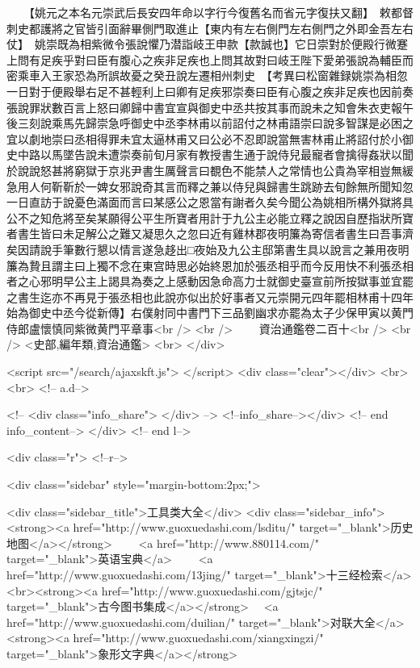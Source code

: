 　　【姚元之本名元崇武后長安四年命以字行今復舊名而省元字復扶又翻】　敕都督刺史都護將之官皆引面辭畢側門取進止【東内有左右側門左右側門之外即金吾左右仗】　姚崇既為相紫微令張說懼乃潜詣岐王申款【款誠也】它日崇對於便殿行微蹇上問有足疾乎對曰臣有腹心之疾非足疾也上問其故對曰岐王陛下愛弟張說為輔臣而密乘車入王家恐為所誤故憂之癸丑說左遷相州刺史　【考異曰松窗雜録姚崇為相忽一日對于便殿舉右足不甚輕利上曰卿有足疾邪崇奏曰臣有心腹之疾非足疾也因前奏張說罪狀數百言上怒曰卿歸中書宜宣與御史中丞共按其事而說未之知會朱衣吏報午後三刻說乘馬先歸崇急呼御史中丞李林甫以前詔付之林甫語崇曰說多智謀是必困之宜以劇地崇曰丞相得罪未宜太逼林甫又曰公必不忍即說當無害林甫止將詔付於小御史中路以馬墜告說未遭崇奏前旬月家有教授書生通于說侍兒最寵者會擒得姦狀以聞於說說怒甚將窮獄于京兆尹書生厲聲言曰覩色不能禁人之常情也公貴為宰相豈無緩急用人何靳靳於一婢女邪說奇其言而釋之兼以侍兒與歸書生跳跡去旬餘無所聞知忽一日直訪于說憂色滿面而言曰某感公之恩當有謝者久矣今聞公為姚相所構外獄將具公不之知危將至矣某願得公平生所寶者用計于九公主必能立釋之說因自歷指狀所寶者書生皆曰未足解公之難又凝思久之忽曰近有雞林郡夜明簾為寄信者書生曰吾事濟矣因請說手筆數行懇以情言遂急趍出□夜始及九公主邸第書生具以說言之兼用夜明簾為贄且謂主曰上獨不念在東宫時思必始終恩加於張丞相乎而今反用快不利張丞相者之心邪明早公主上謁具為奏之上感動因急命高力士就御史臺宣前所按獄事並宜罷之書生迄亦不再見于張丞相也此說亦似出於好事者又元崇開元四年罷相林甫十四年始為御史中丞今從新傳】右僕射同中書門下三品劉幽求亦罷為太子少保甲寅以黄門侍郎盧懷慎同紫微黄門平章事<br />
<br />
　　資治通鑑卷二百十<br />
<br />
<史部,編年類,資治通鑑>  <br>
   </div> 

<script src="/search/ajaxskft.js"> </script>
 <div class="clear"></div>
<br>
<br>
 <!-- a.d-->

 <!--
<div class="info_share">
</div> 
-->
 <!--info_share--></div>   <!-- end info_content-->
  </div> <!-- end l-->

<div class="r">   <!--r-->



<div class="sidebar"  style="margin-bottom:2px;">

 
<div class="sidebar_title">工具类大全</div>
<div class="sidebar_info">
<strong><a href="http://www.guoxuedashi.com/lsditu/" target="_blank">历史地图</a></strong>　　
<a href="http://www.880114.com/" target="_blank">英语宝典</a>　　
<a href="http://www.guoxuedashi.com/13jing/" target="_blank">十三经检索</a>　
<br><strong><a href="http://www.guoxuedashi.com/gjtsjc/" target="_blank">古今图书集成</a></strong>　
<a href="http://www.guoxuedashi.com/duilian/" target="_blank">对联大全</a>　<strong><a href="http://www.guoxuedashi.com/xiangxingzi/" target="_blank">象形文字典</a></strong>　

